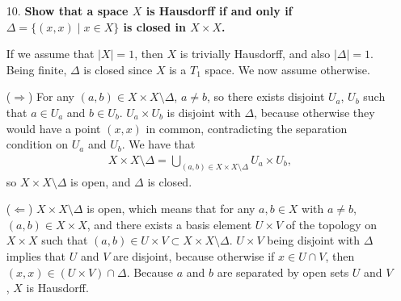 \documentclass[a4paper,12pt]{article}
\begin{document}
\begin{enumerate}
    \item[10.]
        \boldmath\textbf{Show that a space $X$ is Hausdorff if and only if $\Delta = \{ (x, x) \mid x \in X \}$ is closed in $X \times X$.
        }\unboldmath \par
        \iffalse
            Then for any $y \in X \setminus \Delta$, there exists an open set $U_y$ disjoint from $\Delta$, and thus,
            \begin{align*}
                X \setminus \{a\} = \bigcup_{b \in X \setminus \{a\}} U_b,
            \end{align*}
            being a union of open sets, is open.
        \fi
        If we assume that $|X| = 1$, then $X$ is trivially Hausdorff, and also $|\Delta| = 1$. Being finite, $\Delta$ is closed since $X$ is a $T_1$ space. We now assume otherwise. \par
        ($\Rightarrow$) For any $(a, b) \in X \times X \setminus \Delta$, $a \neq b$, so there exists disjoint $U_a$, $U_b$ such that $a \in U_a$ and $b \in U_b$. $U_a \times U_b$ is disjoint with $\Delta$, because otherwise they would have a point $(x, x)$ in common, contradicting the separation condition on $U_a$ and $U_b$. We have that
        \begin{align*}
            X \times X \setminus \Delta = \bigcup_{(a, b) \in X \times X \setminus \Delta} U_a \times U_b,
        \end{align*}
        so $X \times X \setminus \Delta$ is open, and $\Delta$ is closed. \par
        ($\Leftarrow$) $X \times X \setminus \Delta$ is open, which means that for any $a, b \in X$ with $a \neq b$, $(a, b) \in X \times X$, and there exists a basis element $U \times V$ of the topology on $X \times X$ such that $(a, b) \in U \times V \subset X \times X \setminus \Delta$. $U \times V$ being disjoint with $\Delta$ implies that $U$ and $V$ are disjoint, because otherwise if $x \in U \cap V$, then $(x, x) \in (U \times V) \cap \Delta$. Because $a$ and $b$ are separated by open sets $U$ and $V$, $X$ is Hausdorff.
\end{enumerate}
\end{document}
